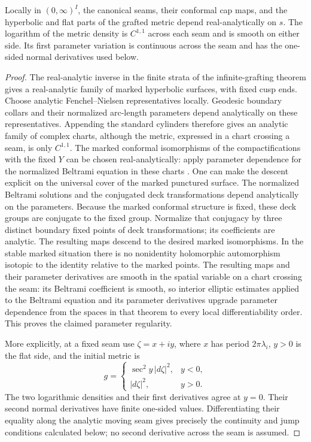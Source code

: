 \begin{lemma}\label{A2b-regularity}
Locally in $(0,\infty)^I$, the canonical seams, their conformal cap maps,
and the hyperbolic and flat parts of the grafted metric depend
real-analytically on $s$. The logarithm of the metric density is $C^{1,1}$
across each seam and is smooth on either side. Its first parameter
variation is continuous across the seam and has the one-sided normal
derivatives used below.
\end{lemma}
\begin{proof}
The real-analytic inverse in the finite strata of the infinite-grafting
theorem gives a real-analytic family of marked hyperbolic surfaces, with
fixed cusp ends. Choose analytic Fenchel--Nielsen representatives locally.
Geodesic boundary collars and their normalized arc-length parameters
depend analytically on these representatives. Appending the standard
cylinders therefore gives an analytic family of complex charts, although
the metric, expressed in a chart crossing a seam, is only $C^{1,1}$.
The marked conformal isomorphisms of the compactifications with the fixed
$Y$ can be chosen real-analytically: apply parameter dependence for the
normalized Beltrami equation in these charts
\cite[\S5.7, Theorems 10--11, pp.~402--403]{AhlforsBers1960A2b}.
One can make the descent explicit on the universal cover of the marked
punctured surface. The normalized Beltrami solutions and the conjugated
deck transformations depend analytically on the parameters. Because
the marked conformal structure is fixed, these deck groups are conjugate
to the fixed group. Normalize that conjugacy by three distinct boundary
fixed points of deck transformations; its coefficients are analytic.
The resulting maps descend to the desired marked isomorphisms. In the
stable marked situation there is no nonidentity holomorphic automorphism
isotopic to the identity relative to the marked points. The resulting
maps and their parameter derivatives are smooth in the spatial variable
on a chart crossing the seam: its Beltrami coefficient is smooth, so
interior elliptic estimates applied to the Beltrami equation and its
parameter derivatives upgrade parameter dependence from the spaces in
that theorem to every local differentiability order. This proves the
claimed parameter regularity.

More explicitly, at a fixed seam use $\zeta=x+iy$, where $x$ has period
$2\pi\lambda_i$, $y>0$ is the flat side, and the initial metric is
\[
 g=\begin{cases}\sec^2y\,|d\zeta|^2,&y<0,\\
                  |d\zeta|^2,&y>0.
   \end{cases}
\]
The two logarithmic densities and their first derivatives agree at
$y=0$. Their second normal derivatives have finite one-sided values.
Differentiating their equality along the analytic moving seam gives
precisely the continuity and jump conditions calculated below; no
second derivative across the seam is assumed.
\end{proof}


